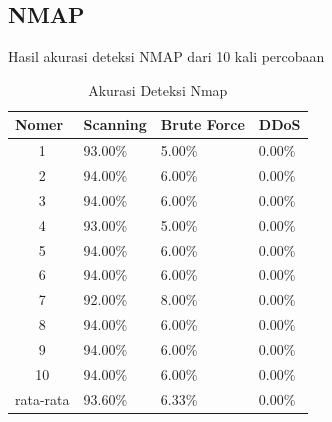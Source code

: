 \subsection{NMAP}
Hasil akurasi deteksi NMAP dari 10 kali percobaan
\begin{table}[H]
	\centering
	\caption{Akurasi Deteksi Nmap}
	\label{Akurasi Deteksi Nmap}
	\begin{tabular}{|c|l|l|l|}
		\hline
		\multicolumn{1}{|l|}{Nomer}     & Scanning & Brute Force & DDoS   \\ \hline
		1                               & 93.00\%  & 5.00\%      & 0.00\% \\ \hline
		2                               & 94.00\%  & 6.00\%      & 0.00\% \\ \hline
		3                               & 94.00\%  & 6.00\%      & 0.00\% \\ \hline
		4                               & 93.00\%  & 5.00\%      & 0.00\% \\ \hline
		5                               & 94.00\%  & 6.00\%      & 0.00\% \\ \hline
		6                               & 94.00\%  & 6.00\%      & 0.00\% \\ \hline
		7                               & 92.00\%  & 8.00\%      & 0.00\% \\ \hline
		8                               & 94.00\%  & 6.00\%      & 0.00\% \\ \hline
		9                               & 94.00\%  & 6.00\%      & 0.00\% \\ \hline
		10                              & 94.00\%  & 6.00\%      & 0.00\% \\ \hline
		\multicolumn{1}{|l|}{rata-rata} & 93.60\%  & 6.33\%      & 0.00\% \\ \hline
	\end{tabular}
\end{table}
\newpage

